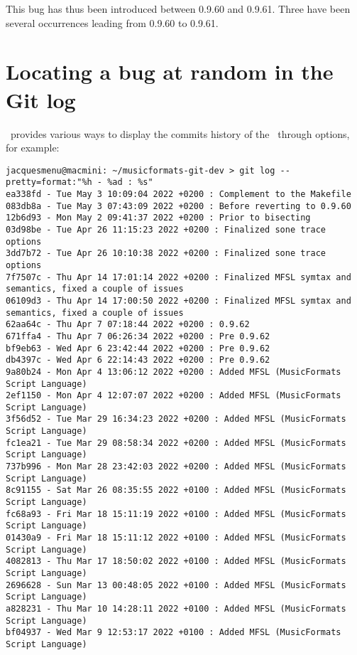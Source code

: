 This bug has thus been introduced between 0.9.60 and 0.9.61.
Three have been several  occurrences leading from 0.9.60 to 0.9.61.


\section{Locating a bug at random in the Git log}

\git\ provides various ways to display the commits history of the \repo\ through  options, for example:
\begin{lstlisting}[language=Terminal]
jacquesmenu@macmini: ~/musicformats-git-dev > git log --pretty=format:"%h - %ad : %s"
ea338fd - Tue May 3 10:09:04 2022 +0200 : Complement to the Makefile
083db8a - Tue May 3 07:43:09 2022 +0200 : Before reverting to 0.9.60
12b6d93 - Mon May 2 09:41:37 2022 +0200 : Prior to bisecting
03d98be - Tue Apr 26 11:15:23 2022 +0200 : Finalized sone trace options
3dd7b72 - Tue Apr 26 10:10:38 2022 +0200 : Finalized sone trace options
7f7507c - Thu Apr 14 17:01:14 2022 +0200 : Finalized MFSL symtax and semantics, fixed a couple of issues
06109d3 - Thu Apr 14 17:00:50 2022 +0200 : Finalized MFSL symtax and semantics, fixed a couple of issues
62aa64c - Thu Apr 7 07:18:44 2022 +0200 : 0.9.62
671ffa4 - Thu Apr 7 06:26:34 2022 +0200 : Pre 0.9.62
bf9eb63 - Wed Apr 6 23:42:44 2022 +0200 : Pre 0.9.62
db4397c - Wed Apr 6 22:14:43 2022 +0200 : Pre 0.9.62
9a80b24 - Mon Apr 4 13:06:12 2022 +0200 : Added MFSL (MusicFormats Script Language)
2ef1150 - Mon Apr 4 12:07:07 2022 +0200 : Added MFSL (MusicFormats Script Language)
3f56d52 - Tue Mar 29 16:34:23 2022 +0200 : Added MFSL (MusicFormats Script Language)
fc1ea21 - Tue Mar 29 08:58:34 2022 +0200 : Added MFSL (MusicFormats Script Language)
737b996 - Mon Mar 28 23:42:03 2022 +0200 : Added MFSL (MusicFormats Script Language)
8c91155 - Sat Mar 26 08:35:55 2022 +0100 : Added MFSL (MusicFormats Script Language)
fc68a93 - Fri Mar 18 15:11:19 2022 +0100 : Added MFSL (MusicFormats Script Language)
01430a9 - Fri Mar 18 15:11:12 2022 +0100 : Added MFSL (MusicFormats Script Language)
4082813 - Thu Mar 17 18:50:02 2022 +0100 : Added MFSL (MusicFormats Script Language)
2696628 - Sun Mar 13 00:48:05 2022 +0100 : Added MFSL (MusicFormats Script Language)
a828231 - Thu Mar 10 14:28:11 2022 +0100 : Added MFSL (MusicFormats Script Language)
bf04937 - Wed Mar 9 12:53:17 2022 +0100 : Added MFSL (MusicFormats Script Language)

\end{lstlisting}
